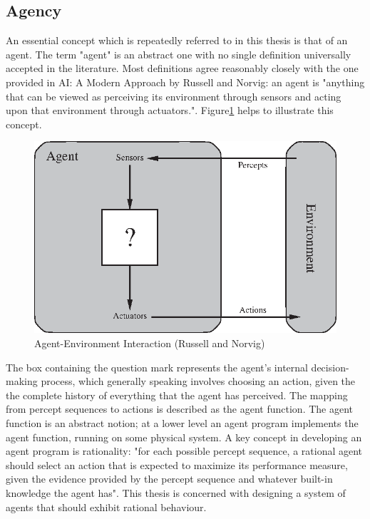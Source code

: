 
\subsection{Agency}
An essential concept which is repeatedly referred to in this thesis is that of an agent. The term "agent" is an abstract one with no single definition universally accepted in the literature. Most definitions agree reasonably closely with the one provided in AI: A Modern Approach by Russell and Norvig: an agent is "anything that can be viewed as perceiving its environment through sensors and acting upon that environment through actuators."\cite{AIAMA}.  Figure\ref{fig:agent_env_interaction} helps to illustrate this concept. \begin{figure}
    \centering
    \includegraphics{Chapters/BackgroundKnowledgeAndRelatedWork/Figs/Vector/agent-environment.eps}
    \caption{Agent-Environment Interaction (Russell and Norvig)\cite[p.~35]{AIAMA}}
    \label{fig:agent_env_interaction}
\end{figure}
The box containing the question mark represents the agent's internal decision-making process, which generally speaking involves choosing an action, given the the complete history of everything that the agent has perceived. The mapping from percept sequences to actions is described as the agent function. The agent function is an abstract notion; at a lower level an agent program implements the agent function, running on some physical system. A key concept in developing an agent program is rationality: "for each possible percept sequence, a rational agent should select an action that is expected to maximize its performance measure, given the evidence provided by the percept sequence and whatever built-in knowledge the agent has"\cite[p.~37]{AIAMA}. This thesis is concerned with designing a system of agents that should exhibit rational behaviour.\newline
 


